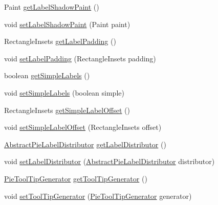 \begin{DoxyCompactItemize}
\item 
Paint \mbox{\hyperlink{classorg_1_1jfree_1_1chart_1_1plot_1_1_pie_plot_a09e7247103d5d1a36b12783c235a574f}{get\+Label\+Shadow\+Paint}} ()
\item 
void \mbox{\hyperlink{classorg_1_1jfree_1_1chart_1_1plot_1_1_pie_plot_aeb9d4d1a5664515d7202816d553613f0}{set\+Label\+Shadow\+Paint}} (Paint paint)
\item 
Rectangle\+Insets \mbox{\hyperlink{classorg_1_1jfree_1_1chart_1_1plot_1_1_pie_plot_af370c04b73e9e3f5b5aaa5e74dc8d9b3}{get\+Label\+Padding}} ()
\item 
void \mbox{\hyperlink{classorg_1_1jfree_1_1chart_1_1plot_1_1_pie_plot_a4edc5bf4dba5fc8192522dd8b1a5c474}{set\+Label\+Padding}} (Rectangle\+Insets padding)
\item 
boolean \mbox{\hyperlink{classorg_1_1jfree_1_1chart_1_1plot_1_1_pie_plot_a7def1f2f684232f0a372168809a88bbe}{get\+Simple\+Labels}} ()
\item 
void \mbox{\hyperlink{classorg_1_1jfree_1_1chart_1_1plot_1_1_pie_plot_a8a21ac7e67bda81b1caec36453fbac5b}{set\+Simple\+Labels}} (boolean simple)
\item 
Rectangle\+Insets \mbox{\hyperlink{classorg_1_1jfree_1_1chart_1_1plot_1_1_pie_plot_a224bcc976ff82ad7446319febe4e5b65}{get\+Simple\+Label\+Offset}} ()
\item 
void \mbox{\hyperlink{classorg_1_1jfree_1_1chart_1_1plot_1_1_pie_plot_af6b12983770243188338750c9858183d}{set\+Simple\+Label\+Offset}} (Rectangle\+Insets offset)
\item 
\mbox{\hyperlink{classorg_1_1jfree_1_1chart_1_1plot_1_1_abstract_pie_label_distributor}{Abstract\+Pie\+Label\+Distributor}} \mbox{\hyperlink{classorg_1_1jfree_1_1chart_1_1plot_1_1_pie_plot_aafd371a674bb115b8d8a0df95d138101}{get\+Label\+Distributor}} ()
\item 
void \mbox{\hyperlink{classorg_1_1jfree_1_1chart_1_1plot_1_1_pie_plot_a8f4cdc293e6bfea16c6ac91daa60c22f}{set\+Label\+Distributor}} (\mbox{\hyperlink{classorg_1_1jfree_1_1chart_1_1plot_1_1_abstract_pie_label_distributor}{Abstract\+Pie\+Label\+Distributor}} distributor)
\item 
\mbox{\hyperlink{interfaceorg_1_1jfree_1_1chart_1_1labels_1_1_pie_tool_tip_generator}{Pie\+Tool\+Tip\+Generator}} \mbox{\hyperlink{classorg_1_1jfree_1_1chart_1_1plot_1_1_pie_plot_a75d9625162da953ddd01905de9805a25}{get\+Tool\+Tip\+Generator}} ()
\item 
void \mbox{\hyperlink{classorg_1_1jfree_1_1chart_1_1plot_1_1_pie_plot_ad520cee8df753e527fc1e1376780de84}{set\+Tool\+Tip\+Generator}} (\mbox{\hyperlink{interfaceorg_1_1jfree_1_1chart_1_1labels_1_1_pie_tool_tip_generator}{Pie\+Tool\+Tip\+Generator}} generator)

\end{DoxyCompactItemize}

